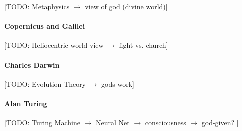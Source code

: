 [TODO: Metaphysics $\to$ view of god (divine world)]

\paragraph{Copernicus and Galilei}

[TODO: Heliocentric world view $\to$ fight vs. church]

\paragraph{Charles Darwin}

[TODO: Evolution Theory $\to$ gods work]

\paragraph{Alan Turing}

[TODO: Turing Machine $\to$ Neural Net $\to$ consciousness $\to$ god-given? ]